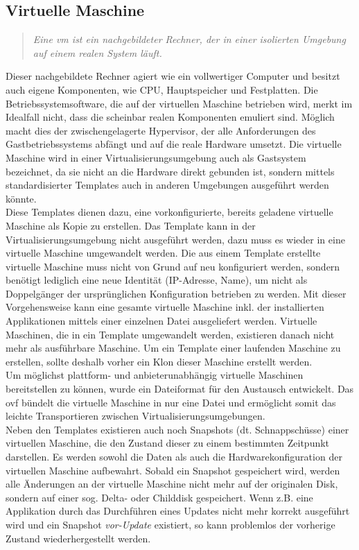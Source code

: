 \subsection{Virtuelle Maschine}
\begin{quote}\textit{\glqq Eine \acrfull{vm} ist ein nachgebildeter Rechner, der in einer isolierten Umgebung auf einem realen System l{\"a}uft.\grqq{}}~\cite[S.~197]{Baun2009}\end{quote}
Dieser nachgebildete Rechner agiert wie ein vollwertiger Computer und besitzt auch eigene Komponenten, wie CPU, Hauptspeicher und Festplatten. Die Betriebssystemsoftware, die auf der virtuellen Maschine betrieben wird, merkt im Idealfall nicht, dass die scheinbar realen Komponenten emuliert sind. Möglich macht dies der zwischengelagerte Hypervisor, der alle Anforderungen des Gastbetriebssystems abfängt und auf die reale Hardware umsetzt. Die virtuelle Maschine wird in einer Virtualisierungsumgebung auch als Gastsystem bezeichnet, da sie nicht an die Hardware direkt gebunden ist, sondern mittels standardisierter Templates auch in anderen Umgebungen ausgeführt werden könnte. \cite[S.~197]{Baun2009}\medskip\\Diese Templates dienen dazu, eine vorkonfigurierte, bereits geladene virtuelle Maschine als Kopie zu erstellen. Das Template kann in der Virtualisierungsumgebung nicht ausgeführt werden, dazu muss es wieder in eine virtuelle Maschine umgewandelt werden. Die aus einem Template erstellte virtuelle Maschine muss nicht von Grund auf neu konfiguriert werden, sondern benötigt lediglich eine neue Identität (IP-Adresse, Name), um nicht als Doppelgänger der ursprünglichen Konfiguration betrieben zu werden. Mit dieser Vorgehensweise kann eine gesamte virtuelle Maschine inkl. der installierten Applikationen mittels einer einzelnen Datei ausgeliefert werden. Virtuelle Maschinen, die in ein Template umgewandelt werden, existieren danach nicht mehr als ausführbare Maschine. Um ein Template einer laufenden Maschine zu erstellen, sollte deshalb vorher ein Klon dieser Maschine erstellt werden. \cite[S.~71]{Portnoy2012}\medskip\\
Um möglichst plattform- und anbieterunabhängig virtuelle Maschinen bereitstellen zu können, wurde ein Dateiformat für den Austausch entwickelt. Das \acrfull{ovf} bündelt die virtuelle Maschine in nur eine Datei und ermöglicht somit das leichte Transportieren zwischen Virtualisierungsumgebungen. \cite[S.~74]{Portnoy2012}\medskip\\
Neben den Templates existieren auch noch Snapshots (dt. Schnappschüsse) einer virtuellen Maschine, die den Zustand dieser zu einem bestimmten Zeitpunkt darstellen. Es werden sowohl die Daten als auch die Hardwarekonfiguration der virtuellen Maschine aufbewahrt. Sobald ein Snapshot gespeichert wird, werden alle Änderungen an der virtuelle Maschine nicht mehr auf der originalen Disk, sondern auf einer sog. Delta- oder Childdisk gespeichert. Wenn z.B. eine Applikation durch das Durchführen eines Updates nicht mehr korrekt ausgeführt wird und ein Snapshot \glqq\textit{vor-Update}\grqq{} existiert, so kann problemlos der vorherige Zustand wiederhergestellt werden. \cite[S.~73]{Portnoy2012}\medskip\\

